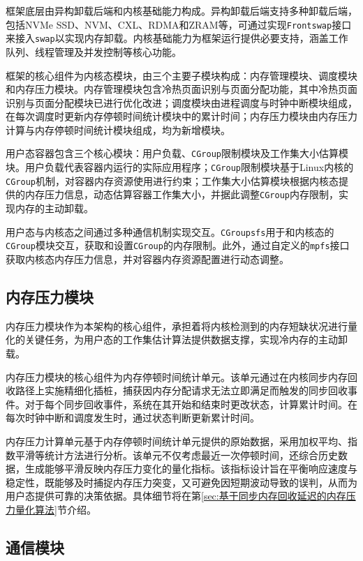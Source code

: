 框架底层由异构卸载后端和内核基础能力构成。异构卸载后端支持多种卸载后端，包括NVMe SSD、NVM、CXL、RDMA和ZRAM等，可通过实现\texttt{Frontswap}接口来接入\texttt{swap}以实现内存卸载。内核基础能力为框架运行提供必要支持，涵盖工作队列、线程管理及并发控制等核心功能。

框架的核心组件为内核态模块，由三个主要子模块构成：内存管理模块、调度模块和内存压力模块。内存管理模块包含冷热页面识别与页面分配功能，其中冷热页面识别与页面分配模块已进行优化改进；调度模块由进程调度与时钟中断模块组成，在每次调度时更新内存停顿时间统计模块中的累计时间；内存压力模块由内存压力计算与内存停顿时间统计模块组成，均为新增模块。

用户态容器包含三个核心模块：用户负载、\texttt{CGroup}限制模块及工作集大小估算模块。用户负载代表容器内运行的实际应用程序；\texttt{CGroup}限制模块基于Linux内核的\texttt{CGroup}机制，对容器内存资源使用进行约束；工作集大小估算模块根据内核态提供的内存压力信息，动态估算容器工作集大小，并据此调整\texttt{CGroup}内存限制，实现内存的主动卸载。

用户态与内核态之间通过多种通信机制实现交互。\texttt{CGroupsfs}用于和内核态的\texttt{CGroup}模块交互，获取和设置\texttt{CGroup}的内存限制。此外，通过自定义的\texttt{mpfs}接口获取内核态内存压力信息，并对容器内存资源配置进行动态调整。

\subsection{内存压力模块}

内存压力模块作为本架构的核心组件，承担着将内核检测到的内存短缺状况进行量化的关键任务，为用户态的工作集估计算法提供数据支撑，实现冷内存的主动卸载。

内存压力模块的核心组件为内存停顿时间统计单元。该单元通过在内核同步内存回收路径上实施精细化插桩，捕获因内存分配请求无法立即满足而触发的同步回收事件。对于每个同步回收事件，系统在其开始和结束时更改状态，计算累计时间。在每次时钟中断和调度发生时，通过状态判断更新累计时间。

内存压力计算单元基于内存停顿时间统计单元提供的原始数据，采用加权平均、指数平滑等统计方法进行分析。该单元不仅考虑最近一次停顿时间，还综合历史数据，生成能够平滑反映内存压力变化的量化指标。该指标设计旨在平衡响应速度与稳定性，既能够及时捕捉内存压力突变，又可避免因短期波动导致的误判，从而为用户态提供可靠的决策依据。具体细节将在第\ref{sec:基于同步内存回收延迟的内存压力量化算法}节介绍。

\subsection{通信模块}

